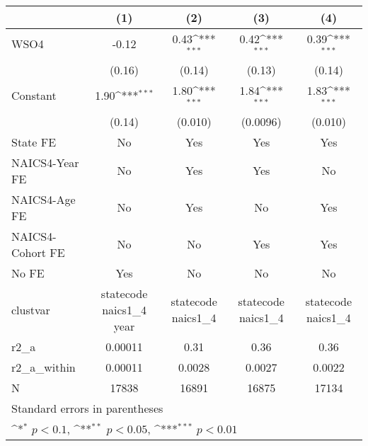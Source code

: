 {
\def\sym#1{\ifmmode^{#1}\else\(^{#1}\)\fi}
\begin{tabular}{l*{4}{c}}
\hline\hline
                    &\multicolumn{1}{c}{(1)}         &\multicolumn{1}{c}{(2)}         &\multicolumn{1}{c}{(3)}         &\multicolumn{1}{c}{(4)}         \\
\hline
WSO4                &       -0.12         &        0.43\sym{***}&        0.42\sym{***}&        0.39\sym{***}\\
                    &      (0.16)         &      (0.14)         &      (0.13)         &      (0.14)         \\
[1em]
Constant            &        1.90\sym{***}&        1.80\sym{***}&        1.84\sym{***}&        1.83\sym{***}\\
                    &      (0.14)         &     (0.010)         &    (0.0096)         &     (0.010)         \\
[1em]
State FE            &          No         &         Yes         &         Yes         &         Yes         \\
[1em]
NAICS4-Year FE      &          No         &         Yes         &         Yes         &          No         \\
[1em]
NAICS4-Age FE       &          No         &         Yes         &          No         &         Yes         \\
[1em]
NAICS4-Cohort FE    &          No         &          No         &         Yes         &         Yes         \\
[1em]
No FE               &         Yes         &          No         &          No         &          No         \\
\hline
clustvar            &statecode naics1\_4 year         &statecode naics1\_4         &statecode naics1\_4         &statecode naics1\_4         \\
r2\_a                &     0.00011         &        0.31         &        0.36         &        0.36         \\
r2\_a\_within         &     0.00011         &      0.0028         &      0.0027         &      0.0022         \\
N                   &       17838         &       16891         &       16875         &       17134         \\
\hline\hline
\multicolumn{5}{l}{\footnotesize Standard errors in parentheses}\\
\multicolumn{5}{l}{\footnotesize \sym{*} \(p<0.1\), \sym{**} \(p<0.05\), \sym{***} \(p<0.01\)}\\
\end{tabular}
}
